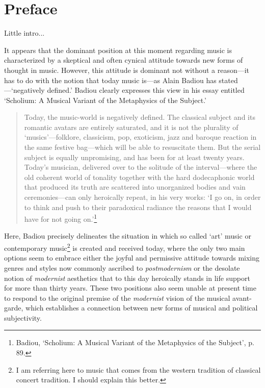 \chapter{Preface}


Little intro...

It appears that the dominant position at this moment regarding music is characterized by a skeptical and often cynical attitude towards new forms of thought in music. However, this attitude is dominant not without a reason---it has to do with the notion that today music is---as Alain Badiou has stated---`negatively defined.' Badiou clearly expresses this view in his essay entitled `Scholium: A Musical Variant of the Metaphysics of the Subject.'
\begin{quote}
Today, the music-world is negatively defined. The classical subject and its romantic avatars are entirely saturated, and it is not the plurality of `musics'---folklore, classicism, pop, exoticism, jazz and baroque reaction in the same festive bag---which will be able to resuscitate them. But the serial subject is equally unpromising, and has been for at least twenty years. Today's  musician, delivered over to the solitude of the interval---where the old coherent world of tonality together with the hard dodecaphonic world that produced its truth are scattered into unorganized bodies and vain ceremonies---can only heroically repeat, in his very works: `I go on, in order to think and push to their paradoxical radiance the reasons that I would have for not going on.'\footnote{Badiou,  `Scholium: A Musical Variant of the Metaphysics of the Subject', p. 89.} 
\end{quote}
Here, Badiou precisely delineates the situation in which so called `art' music or contemporary music\footnote{I am referring here to music that comes from the western tradition of classical concert tradition. I should explain this better.} is created and received today, where the only two main options seem to embrace either the joyful and permissive attitude towards mixing genres and styles now commonly ascribed to \emph{postmodernism} or the desolate notion of \emph{modernist} aesthetics that to this day heroically stands in life support for more than thirty years. These two positions also seem unable at present time to respond to the original premise of the \emph{modernist} vision of the musical avant-garde, which establishes a connection between new forms of musical and political subjectivity.

